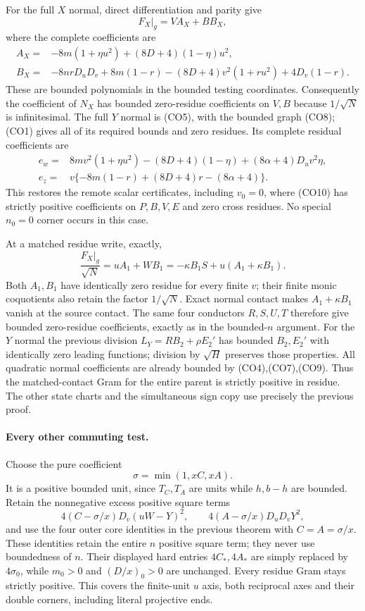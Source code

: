 For the full $X$ normal, direct differentiation and parity give
\[
 \left.F_X\right|_g=V A_X+B B_X,
\]
where the complete coefficients are
\begin{align*}
 A_X={}&-8m(1+\eta u^2)+(8D+4)(1-\eta)u^2,\\
 B_X={}&-8nrD_uD_v+8m(1-r)
       -(8D+4)v^2(1+ru^2)+4D_v(1-r).
\end{align*}
These are bounded polynomials in the bounded testing coordinates.
Consequently the coefficient of $\widehat N_X$ has bounded
zero-residue coefficients on $V,B$ because $1/\sqrt N$ is
infinitesimal.  The full $Y$ normal is (CO5), with the bounded
graph (CO8); (CO1) gives all of its required bounds and zero residues.
Its complete residual coefficients are
\begin{align*}
 e_w={}&8mv^2(1+\eta u^2)-(8D+4)(1-\eta)
                     +(8\alpha+4)D_uv^2\eta,\\
 e_z={}&v\{-8m(1-r)+(8D+4)r-(8\alpha+4)\}.
\end{align*}
This restores the remote scalar certificates, including $v_0=0$,
where (CO10) has strictly positive coefficients on $P,B,V,E$ and
zero cross residues.  No special $n_0=0$ corner occurs in this case.

At a matched residue write, exactly,
\[
 \frac{F_X|_g}{\sqrt N}=uA_1+WB_1
   =-\kappa B_1S+u(A_1+\kappa B_1).
\]
Both $A_1,B_1$ have identically zero residue for every finite $v$;
their finite monic coquotients also retain the factor $1/\sqrt N$.
Exact normal contact makes $A_1+\kappa B_1$ vanish at the source
contact.  The same four conductors $R,S,U,T$ therefore give bounded
zero-residue coefficients, exactly as in the bounded-$n$ argument.
For the $Y$ normal the previous division
$L_Y=RB_2+\rho E_2'$ has bounded $B_2,E_2'$ with identically zero
leading functions; division by $\sqrt H$ preserves those properties.
All quadratic normal coefficients are already bounded by
(CO4),(CO7),(CO9).  Thus the matched-contact Gram for the entire
parent is strictly positive in residue.  The other state charts and
the simultaneous sign copy use precisely the previous proof.

\paragraph{Every other commuting test.}
Choose the pure coefficient
\[
                         \sigma=\min(1,xC,xA).
\]
It is a positive bounded unit, since $T_C,T_A$ are units while
$h,b-h$ are bounded.  Retain the nonnegative excess positive square terms
\[
 4(C-\sigma/x)D_v(uW-Y)^2,
 \qquad4(A-\sigma/x)D_uD_vY^2,
\]
and use the four outer core identities in the previous theorem with
$C=A=\sigma/x$.  These identities retain the entire $n$ positive square term;
they never use boundedness of $n$.  Their displayed hard entries
$4C_*,4A_*$ are simply replaced by $4\sigma_0$, while $m_0>0$
and $(D/x)_0>0$ are unchanged.  Every residue Gram stays strictly
positive.  This covers the finite-unit $u$ axis, both reciprocal
axes and their double corners, including literal projective ends.

